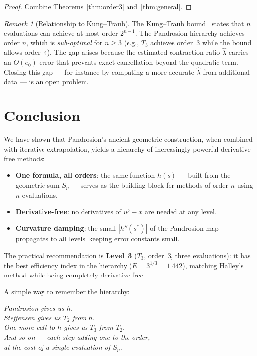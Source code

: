\documentclass[10pt,a4paper,oneside]{book}
\theoremstyle{definition}
\theoremstyle{remark}
\newtheorem{remark}[theorem]{Remark}
\begin{document}
\begin{proof}
Combine Theorems~\ref{thm:order3} and~\ref{thm:general}.
\end{proof}

\begin{remark}[Relationship to Kung--Traub]
The Kung--Traub bound~\cite{kungtraub} states that $n$ evaluations can achieve at most order $2^{n-1}$.  The Pandrosion hierarchy achieves order $n$, which is \emph{sub-optimal} for $n \geq 3$ (e.g., $T_3$ achieves order~$3$ while the bound allows order~$4$).  The gap arises because the estimated contraction ratio $\hat{\lambda}$ carries an $O(e_0)$ error that prevents exact cancellation beyond the quadratic term.  Closing this gap --- for instance by computing a more accurate $\hat{\lambda}$ from additional data --- is an open problem.
\end{remark}

\section{Conclusion}
\label{sec:conclusion}

We have shown that Pandrosion's ancient geometric construction, when combined with iterative extrapolation, yields a hierarchy of increasingly powerful derivative-free methods:

\begin{itemize}
  \item \textbf{One formula, all orders}: the same function $h(s)$ --- built from the geometric sum $S_p$ --- serves as the building block for methods of order $n$ using $n$ evaluations.
  \item \textbf{Derivative-free}: no derivatives of $u^p - x$ are needed at any level.
  \item \textbf{Curvature damping}: the small $|h''(s^*)|$ of the Pandrosion map propagates to all levels, keeping error constants small.
\end{itemize}

The practical recommendation is \textbf{Level~3} ($T_3$, order~$3$, three evaluations): it has the best efficiency index in the hierarchy ($E = 3^{1/3} = 1.442$), matching Halley's method while being completely derivative-free.

\medskip

A simple way to remember the hierarchy:
\begin{center}
\itshape
Pandrosion gives us $h$.\\
Steffensen gives us $T_2$ from $h$.\\
One more call to $h$ gives us $T_3$ from $T_2$.\\
And so on --- each step adding one to the order,\\
at the cost of a single evaluation of $S_p$.
\end{center}
\end{document}
